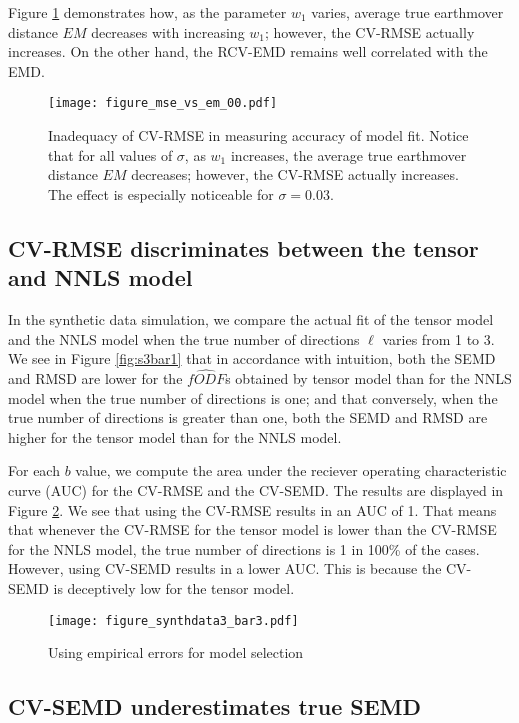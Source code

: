 \documentclass[11pt]{article}
\begin{document}
Figure \ref{fig:mse1} demonstrates how, as the parameter $w_1$ varies,
average true earthmover distance $EM$ decreases with increasing $w_1$;
however, the CV-RMSE actually increases.
On the other hand, the RCV-EMD remains well correlated with the EMD.

\begin{figure}[h]
\centering
\texttt{[image: figure\_mse\_vs\_em\_00.pdf]}
\caption{Inadequacy of CV-RMSE in measuring accuracy of model fit.
Notice that for all values of $\sigma$, as $w_1$ increases, the
average true earthmover distance $EM$ decreases;
however, the CV-RMSE actually increases.
The effect is especially noticeable for $\sigma=0.03$.
}
\label{fig:mse1}
\end{figure}

\subsection[CV-RMSE discriminates]{CV-RMSE discriminates between the tensor and NNLS model}

In the synthetic data simulation, we compare the actual fit of the
tensor model and the NNLS model when the true number of directions
$\ell$ varies from 1 to 3.
We see in Figure \ref{fig:s3bar1} that in accordance with intuition,
both the SEMD and RMSD are lower for the $\hat{fODF}$s obtained by tensor model than for the NNLS
model when the true number of directions is one;
and that conversely, when the true number of directions is greater
than one, both the SEMD and RMSD are higher for the tensor model than
for the NNLS model.

For each $b$ value, we compute the area under the reciever operating
characteristic curve (AUC) for the CV-RMSE and the CV-SEMD.
The results are displayed in Figure \ref{fig:s3bar3}.
We see that using the CV-RMSE results in an AUC of 1.
That means that whenever the CV-RMSE for the tensor model is lower than the CV-RMSE
for the NNLS model, the true number of directions is 1 in 100\% of the
cases.
However, using CV-SEMD results in a lower AUC.
This is because the CV-SEMD is deceptively low for the tensor model.

\begin{figure}[h]
\hspace{-50pt}
\texttt{[image: figure\_synthdata3\_bar3.pdf]}
\caption{Using empirical errors for model selection}
\label{fig:s3bar3}
\end{figure}

\subsection[CV-EMD underestimates]{CV-SEMD underestimates true SEMD}
\end{document}
